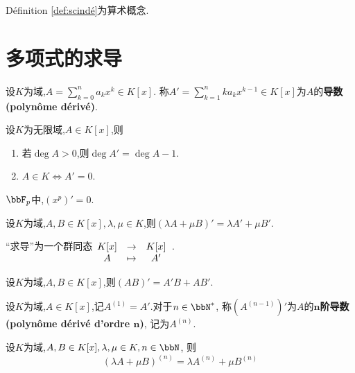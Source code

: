 \begin{rqq}
    Définition \ref{def:scindé}为算术概念.
\end{rqq}

\section{多项式的求导}

\begin{deff}
    设$K$为域,$A = \sum\limits_{k=0}^n a_k x^k \in K[x]$.
    称$A' = \sum\limits_{k=1}^n k a_k x^{k-1} \in K[x]$为$A$的\textbf{导数(polynôme dérivé)}.
\end{deff}

\begin{prop}
    设$K$为无限域,$A \in K[x]$,则
    \begin{enumerate}
        \item 若$\deg A > 0$,则$\deg A' = \deg A - 1$.
        \item $A \in K \iff A' = 0$.
    \end{enumerate}
\end{prop}

\begin{rqq}
    $\bbF_p$中,$(x^p)' = 0$.
\end{rqq}

\begin{prop}
    设$K$为域,$A, B \in K[x], \lambda, \mu \in K$,则$(\lambda A + \mu B)' = \lambda A' + \mu B'$.
\end{prop}

\begin{rqq}
    ``求导''为一个群同态$\begin{array}[t]{ccc} K[x] & \to & K[x] \\ A & \mapsto & A' \end{array}$.
\end{rqq}

\begin{prop}
    设$K$为域,$A, B \in K[x]$,则$(AB)' = A'B + AB'$.
\end{prop}

\begin{deff}
    设$K$为域,$A \in K[x]$,记$A^{(1)} = A'$.对于$n \in \bbN^*$,
    称$(A^{(n-1)})'$为$A$的\textbf{$\boldsymbol{n}$阶导数(polynôme dérivé d'ordre $\boldsymbol{n}$)},
    记为$A^{(n)}$.
\end{deff}

\begin{prop}
    设$K$为域,$A, B \in K[x], \lambda, \mu \in K, n \in \bbN$,
    则\[ (\lambda A + \mu B)^{(n)} = \lambda A^{(n)} + \mu B^{(n)} \]
\end{prop}

